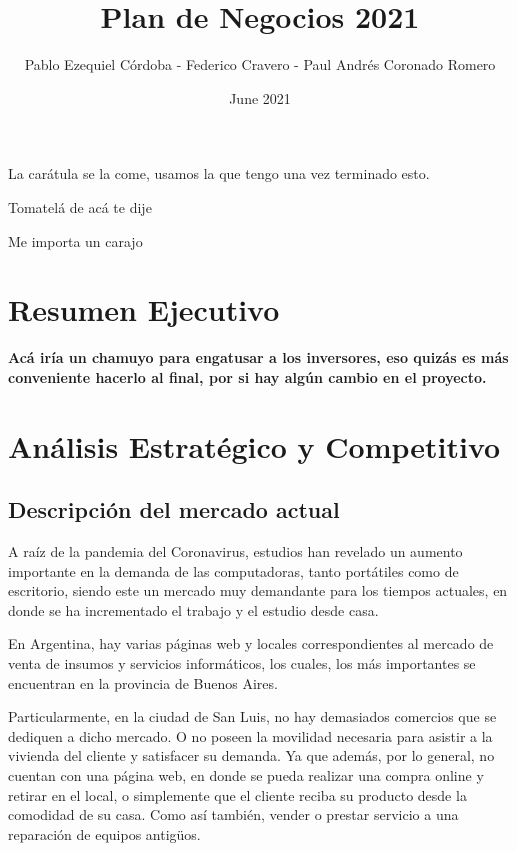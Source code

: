 \documentclass[11pt,a4paper]{article}
\title{Plan de Negocios 2021}
\author{Pablo Ezequiel Córdoba - Federico Cravero - Paul Andrés Coronado Romero}
\date{June 2021}
\begin{document}
\maketitle
La carátula se la come, usamos la que tengo una vez terminado esto.

Tomatelá de acá te dije

Me importa un carajo
\pagebreak

\tableofcontents

\section{Resumen Ejecutivo}

\textbf{Acá iría un chamuyo para engatusar a los inversores, eso quizás es más conveniente hacerlo al final, por si hay algún cambio en el proyecto.}

\section{Análisis Estratégico y Competitivo}

\subsection{Descripción del mercado actual}

A raíz de la pandemia del Coronavirus, estudios han revelado un aumento importante en la demanda de las computadoras, tanto portátiles como de escritorio, siendo este un mercado muy demandante para los tiempos actuales, en donde se ha incrementado el trabajo y el estudio desde casa.

En Argentina, hay varias páginas web y locales correspondientes al mercado de venta de insumos y servicios informáticos, los cuales, los más importantes se encuentran en la provincia de Buenos Aires.

Particularmente, en la ciudad de San Luis, no hay demasiados comercios que se dediquen a dicho mercado. O no poseen la movilidad necesaria para asistir a la vivienda del cliente y satisfacer su demanda. Ya que además, por lo general, no cuentan con una página web, en donde se pueda realizar una compra online y retirar en el local, o simplemente que el cliente reciba su producto desde la comodidad de su casa. Como así también, vender o prestar servicio a una reparación de equipos antigüos. 
\end{document}
